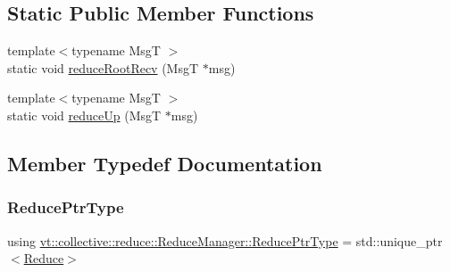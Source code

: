\subsection*{Static Public Member Functions}
\begin{DoxyCompactItemize}
\item 
{\footnotesize template$<$typename MsgT $>$ }\\static void \hyperlink{structvt_1_1collective_1_1reduce_1_1_reduce_manager_a7ee21e635c585acc7d7339911a0900eb}{reduce\+Root\+Recv} (MsgT $\ast$msg)
\item 
{\footnotesize template$<$typename MsgT $>$ }\\static void \hyperlink{structvt_1_1collective_1_1reduce_1_1_reduce_manager_a744a70b8e28ef9c58cb9ccdb06493d15}{reduce\+Up} (MsgT $\ast$msg)
\end{DoxyCompactItemize}


\subsection{Member Typedef Documentation}
\mbox{\label{structvt_1_1collective_1_1reduce_1_1_reduce_manager_ae6d6635476f9d9f601d131a334ca3817}} 
\subsubsection{\texorpdfstring{Reduce\+Ptr\+Type}{ReducePtrType}}
{\footnotesize\ttfamily using \hyperlink{structvt_1_1collective_1_1reduce_1_1_reduce_manager_ae6d6635476f9d9f601d131a334ca3817}{vt\+::collective\+::reduce\+::\+Reduce\+Manager\+::\+Reduce\+Ptr\+Type} =  std\+::unique\+\_\+ptr$<$\hyperlink{structvt_1_1collective_1_1reduce_1_1_reduce}{Reduce}$>$}

\mbox{\label{structvt_1_1collective_1_1reduce_1_1_reduce_manager_a2c340e5d3b12e4f2df64b9c1502445cf}} 
